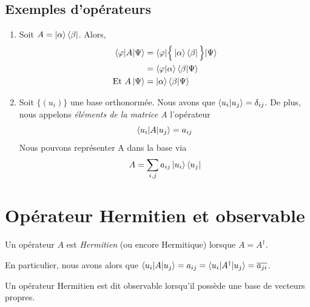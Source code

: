 \documentclass[../notesdecours.tex]{subfiles}
\begin{document}
\subsection{Exemples d'opérateurs}
\begin{enumerate}
\item Soit $A=\ket{\alpha}\bra{\beta}$. Alors,
\begin{align}
\braket{\varphi|A|\Psi} &= \braket{\varphi|\Big\{\ket{\alpha}\bra{\beta}\Big\}|\Psi}\\
&= \braket{\varphi|\alpha}\braket{\beta|\Psi}\\
\text{Et } A\ket{\Psi} &= \ket{\alpha}\braket{\beta|\Psi}
\end{align}
\item Soit $\Big\{(u_i)\Big\}$ une base orthonormée. Nous avons que $\braket{u_i|u_j} = \delta_{ij}$. De plus, nous appelons \emph{éléments de la matrice A} l'opérateur
\begin{equation}
\braket{u_i|A|u_j} = a_{ij}
\end{equation}
Nous pouvons représenter A dans la base via
\begin{equation}
A = \sum_{i,j} a_{ij} \ket{u_i}\bra{u_j}
\end{equation}
\end{enumerate}

\section{Opérateur Hermitien et observable}
\begin{definition}
Un opérateur $A$ est \emph{Hermitien} (ou encore Hermitique) lorsque $A = A^\dag$.
\end{definition}
\begin{Property}
En particulier, nous avons alors que $\braket{u_i|A|u_j} = a_{ij} = \braket{u_i|A^\dag|u_j} = \overline{a_{ji}}$.
\end{Property}
\begin{definition}
Un opérateur Hermitien est dit observable lorsqu'il possède une base de vecteurs propres.
\end{definition}
\end{document}
